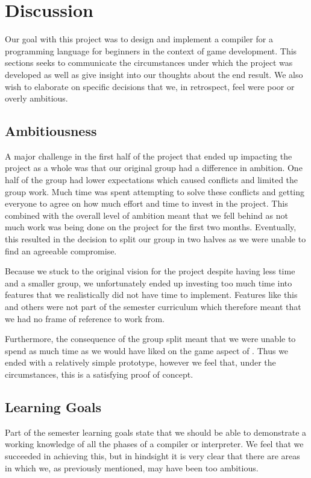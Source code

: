\chapter{Discussion}
Our goal with this project was to design and implement a compiler for a programming language for beginners in the context of game development. 
This sections seeks to communicate the circumstances under which the project was developed as well as give insight into our thoughts about the end result.
We also wish to elaborate on specific decisions that we, in retrospect, feel were poor or overly ambitious.

\section{Ambitiousness}
A major challenge in the first half of the project that ended up impacting the project as a whole was that our original group had a difference in ambition. 
One half of the group had lower expectations which caused conflicts and limited the group work.
Much time was spent attempting to solve these conflicts and getting everyone to agree on how much effort and time to invest in the project.
This combined with the overall level of ambition meant that we fell behind as not much work was being done on the project for the first two months. 
Eventually, this resulted in the decision to split our group in two halves as we were unable to find an agreeable compromise.

Because we stuck to the original vision for the project despite having less time and a smaller group, we unfortunately ended up investing too much time into features that we realistically did not have time to implement.
Features like this and others were not part of the semester curriculum which therefore meant that we had no frame of reference to work from.

Furthermore, the consequence of the group split meant that we were unable to spend as much time as we would have liked on the game aspect of \dazel{}. 
Thus we ended with a relatively simple prototype, however we feel that, under the circumstances, this is a satisfying proof of concept.

\section{Learning Goals}
Part of the semester learning goals state that we should be able to demonstrate a working knowledge of all the phases of a compiler or interpreter. We feel that we succeeded in achieving this, but in hindsight it is very clear that there are areas in which we, as previously mentioned, may have been too ambitious. 

